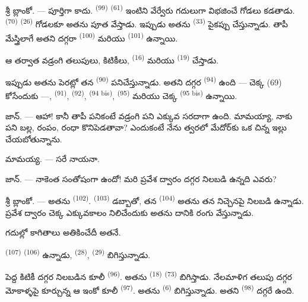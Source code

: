 \VUsaut{3.0mm}
\VUsaut{3.0mm}

శ్రీ \textsc{బ్లాంకో}. --- పూర్తిగా కాదు.  \textsuperscript{(99)}
 \textsuperscript{(61)} ఇంటిని వేర్వేరు గదులుగా విభజించే గోడలు కడతాడు.
 \textsuperscript{(70)}  \textsuperscript{(26)} గోడలకూ
అతను పూత వేస్తాడు. ఇప్పుడు అతను  \textsuperscript{(33)} పైకప్పు చేస్తున్నాడు.
తాపీ మేస్త్రిలాగే అతని దగ్గరా  \textsuperscript{(100)} మరియు 
\textsuperscript{(101)} ఉన్నాయి.

ఆ తర్వాత వడ్రంగి తలుపులు, కిటికీలు,  \textsuperscript{(16)} మరియు
 \textsuperscript{(19)} చేస్తాడు.

ఇప్పుడు అతను పెరట్లో తన  \textsuperscript{(90)} పనిచేస్తున్నాడు. అతని దగ్గర
 \textsuperscript{(94)} ఉంది — చెక్క (69) కోసేందుకు —, 
\textsuperscript{(91)},  \textsuperscript{(92)}, 
\textsuperscript{(94 bis)},  \textsuperscript{(95)} మరియు చెక్క
 \textsuperscript{(95 bis)} ఉన్నాయి.

\textsc{జాన్}. --- ఆహా! కానీ తాపీ పనికంటే వడ్రంగి పని ఎక్కువ సరదాగా ఉంది. మామయ్యా, నాకు పని
బల్ల, రంపం, రంధా కొనిపెడతావా? ఎందుకంటే నేను త్వరలో మేదోర్‌కు ఒక చిన్న ఇల్లు చేయబోతున్నాను.

\textsc{మామయ్య}. --- సరే నాయనా.

\textsc{జాన్}. --- నాకెంత సంతోషంగా ఉందో! మరి ప్రవేశ ద్వారం దగ్గర నిలబడి ఉన్నది ఎవరు?

\VUsaut{3.0mm}
\VUsaut{3.0mm}

శ్రీ \textsc{బ్లాంకో}. --- అతను  \textsuperscript{(102)}. 
\textsuperscript{(103)} డబ్బాతో, తన  \textsuperscript{(104)} అతను తన నిచ్చెనపై
నిలబడి ఉన్నాడు. ప్రవేశ ద్వారం చెక్క ఎక్కువకాలం నిలిచేందుకు అతను దానికి రంగు వేస్తున్నాడు.

గదుల్లో కాగితాలు అతికించేదీ అతనే.

 \textsuperscript{(107)}  \textsuperscript{(106)}
ఉన్నాడు,  \textsuperscript{(28)},  \textsuperscript{(29)}
బిగిస్తున్నాడు.

పెద్ద కిటికీ దగ్గర నిలబడిన కూలీ  \textsuperscript{(96)}. అతను
 \textsuperscript{(18)}  \textsuperscript{(73)} బిగిస్తాడు.
నేలమాళిగ తలుపు దగ్గర మోకాళ్ళపై కూర్చున్న ఆ ఇంకో కూలీ 
\textsuperscript{(97)}. అతను  \textsuperscript{(6)} బిగిస్తున్నాడు. అతని
 \textsuperscript{(98)} దగ్గరే ఉంది.

